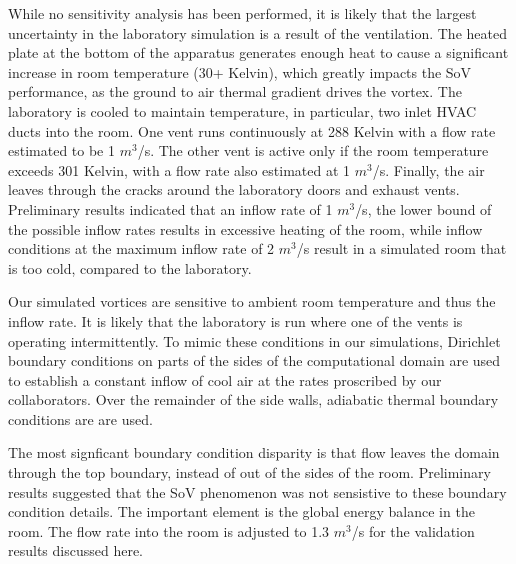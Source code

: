 
While no sensitivity analysis has been performed, it is likely that the
largest uncertainty in the laboratory simulation is a result of the
ventilation. The heated plate at the bottom of the apparatus
generates enough heat to cause a significant increase in room
temperature (30+ Kelvin), which greatly impacts the SoV
performance, as the ground to air thermal gradient drives the
vortex. The laboratory is cooled to maintain
temperature, in particular, two inlet HVAC ducts into the room. 
One vent runs continuously at 288 Kelvin with a flow rate estimated 
to be 1 $m^3$/s.
The other vent is active only if the room temperature exceeds 301 Kelvin, 
with a flow rate also estimated at 1 $m^3$/s.
Finally, the air leaves through the cracks around the laboratory doors and 
exhaust vents. 
Preliminary results indicated that an
inflow rate of 1 $m^3$/s, the lower bound of the possible inflow rates 
results in excessive heating of the room, while inflow conditions at the 
maximum inflow rate of 2 $m^3$/s result in a simulated room that 
is too cold, compared to the laboratory. 

Our simulated vortices are sensitive to ambient room temperature and thus 
the inflow rate. It is likely that the laboratory is run where one of
the vents is operating intermittently. 
To mimic these conditions in our simulations, Dirichlet boundary conditions 
on parts of the sides of the computational domain are used to
establish a constant inflow of cool air at the rates 
proscribed by our collaborators. Over the remainder of the side walls, 
adiabatic thermal boundary conditions are are used. 

The most signficant boundary condition disparity is that
flow leaves the domain through the top boundary, instead of out
of the sides of the room. Preliminary results suggested that the SoV phenomenon 
was not sensistive to these boundary condition details. The important element is the 
global energy balance in the room. The flow rate into the room is adjusted to 
1.3 $m^3$/s for the validation results discussed here. 


